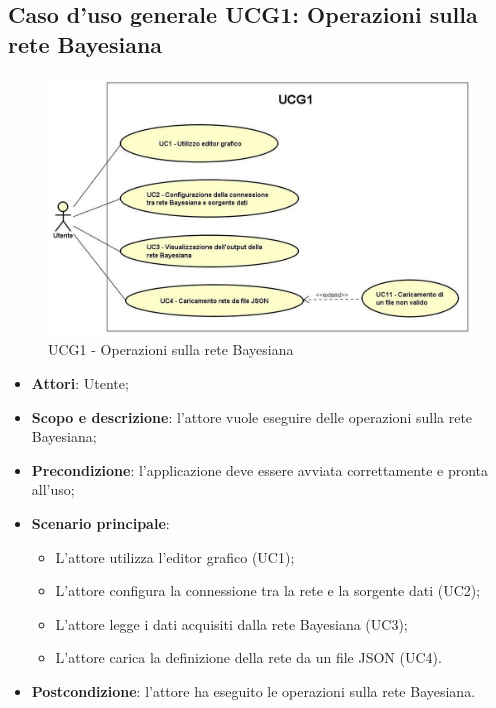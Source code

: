 \newpage
\subsection{Caso d'uso generale UCG1: Operazioni sulla rete Bayesiana}
\begin{figure} [H]
	\centering
	\includegraphics[scale=0.7]{Img/UCG1}
	\caption{UCG1 - Operazioni sulla rete Bayesiana}\label{}
\end{figure}
\begin{itemize}
	\item{\textbf{Attori}: Utente;}
	\item{\textbf{Scopo e descrizione}: l'attore vuole eseguire delle operazioni sulla rete Bayesiana;}
	\item{\textbf{Precondizione}: l'applicazione deve essere avviata correttamente e pronta all'uso;}
	\item{\textbf{Scenario principale}:
		\begin{itemize}
			\item{L'attore utilizza l'editor grafico (UC1);}
			\item{L'attore configura la connessione tra la rete e la sorgente dati (UC2);}
			\item{L'attore legge i dati acquisiti dalla rete Bayesiana (UC3)};
			\item{L'attore carica la definizione della rete da un file JSON (UC4).}
		\end{itemize}
	}
	\item{\textbf{Postcondizione}: l'attore ha eseguito le operazioni sulla rete Bayesiana.}
\end{itemize}

